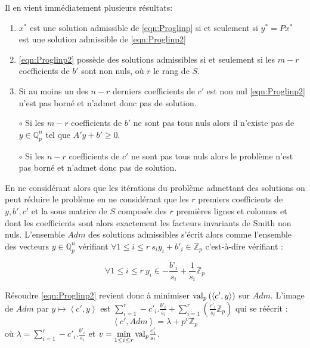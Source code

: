 \begin{remarques}
	
Il en vient immédiatement plusieurs résultats:
\begin{enumerate}
	\item $x^*$ est une solution admissible de \ref{eqn:Proglinp} si et seulement si $y^* = P x^*$ est une solution admissible de \ref{eqn:Proglinp2}
	\item \ref{eqn:Proglinp2} possède des solutions admissibles si et seulement si les $m-r$ coefficients de $b'$ sont non nuls, où $r$ le rang de $S$.
	\item Si au moins un des $n-r$ derniers coefficients de $c'$ est non nul \ref{eqn:Proglinp2} n'est pas borné et n'admet donc pas de solution.   
\end{enumerate}

\end{remarques}

\begin{propriete}
	\begin{itemize}~

		\item[$\circ$] Si les $m-r$ coefficients de $b'$ ne sont pas tous nuls alors il n'existe pas de $y \in \mathbb{Q}_{p} ^n$ tel que $A'y+b' \ge  0$.
	\item[$\circ$] Si les $n-r$ coefficients de $c'$ ne sont pas tous nuls alors le problème n'est pas borné et n'admet donc pas de solution. \end{itemize} 
\end{propriete}
En ne considérant alors que les itérations du problème admettant des solutions on peut réduire le problème en ne considérant que les $r$ premiers coefficients de $y, b', c'$ et la sous matrice de $S$ composée des $r$ premières lignes et colonnes et dont les coefficients sont alors exactement les facteurs invariants de Smith non nuls. L'ensemble $Adm$ des solutions admissibles s'écrit alors comme l'ensemble des vecteurs $y \in \mathbb{Q}_{ p } ^n$ vérifiant $
\forall 1 \le i\le r \ s_i y_i + b'_i \in \mathbb{Z}_p$ c'est-à-dire vérifiant :

\begin{equation}
	\forall 1 \le i\le r  \ y_i \in -\frac{b’_i}{s_i} + \frac{1}{s_i} \mathbb{Z}_p
\end{equation}
 

Résoudre \ref{eqn:Proglinp2} revient donc à minimiser $\text{val}_p\left(\left<c',y \right>\right)$ sur $Adm$. L'image de $Adm$ par $y \mapsto \left<c',y \right>$ est $\sum_{i=1}^r -c'_i.\frac{b'_i}{s_i} + \sum_{i=1}^r\left( \frac{c'_i}{s_{i}} \mathbb{Z}_p \right)$ qui se réécrit :
$$\left<c',Adm \right> = \lambda + p^{v} \mathbb{Z}_p$$
où $\lambda = \sum\limits_{i=1}^r -c'_i.\frac{b'_i}{s_i}$ et $v = \min\limits_{1\le i\le r} \text{val}_p \frac{c'_{i}}{s_{i}} $.

